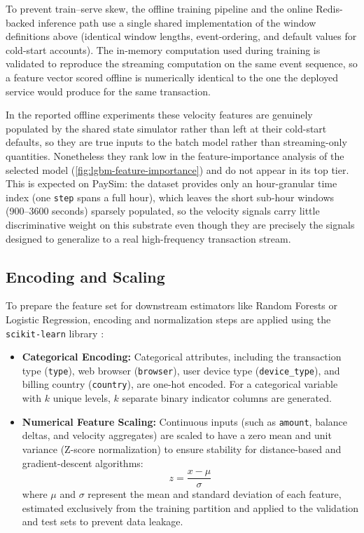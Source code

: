To prevent train--serve skew, the offline training pipeline and the online Redis-backed inference path use a single shared implementation of the window definitions above (identical window lengths, event-ordering, and default values for cold-start accounts). The in-memory computation used during training is validated to reproduce the streaming computation on the same event sequence, so a feature vector scored offline is numerically identical to the one the deployed service would produce for the same transaction.

In the reported offline experiments these velocity features are genuinely populated by the shared state simulator rather than left at their cold-start defaults, so they are true inputs to the batch model rather than streaming-only quantities. Nonetheless they rank low in the feature-importance analysis of the selected model (\cref{fig:lgbm-feature-importance}) and do not appear in its top tier. This is expected on PaySim: the dataset provides only an hour-granular time index (one \texttt{step} spans a full hour), which leaves the short sub-hour windows (900--3600 seconds) sparsely populated, so the velocity signals carry little discriminative weight on this substrate even though they are precisely the signals designed to generalize to a real high-frequency transaction stream.

\subsection{Encoding and Scaling}

To prepare the feature set for downstream estimators like Random Forests \citep{breiman2001random} or Logistic Regression, encoding and normalization steps are applied using the \texttt{scikit-learn} library \citep{pedregosa2011scikit}:

\begin{itemize}
    \item \textbf{Categorical Encoding:} Categorical attributes, including the transaction type (\texttt{type}), web browser (\texttt{browser}), user device type (\texttt{device\_type}), and billing country (\texttt{country}), are one-hot encoded. For a categorical variable with $k$ unique levels, $k$ separate binary indicator columns are generated.
    \item \textbf{Numerical Feature Scaling:} Continuous inputs (such as \texttt{amount}, balance deltas, and velocity aggregates) are scaled to have a zero mean and unit variance (Z-score normalization) to ensure stability for distance-based and gradient-descent algorithms:
    \begin{equation}
        z = \frac{x - \mu}{\sigma}
    \end{equation}
    where $\mu$ and $\sigma$ represent the mean and standard deviation of each feature, estimated exclusively from the training partition and applied to the validation and test sets to prevent data leakage.
\end{itemize}

